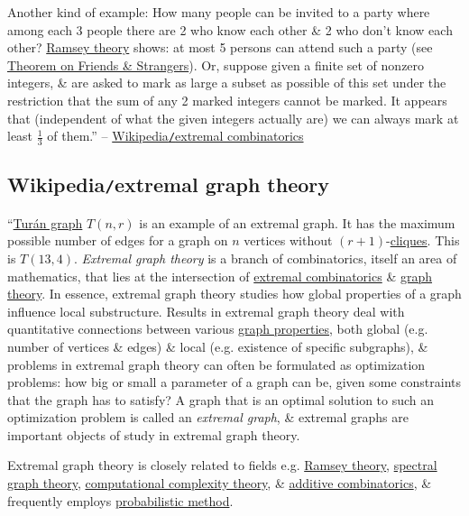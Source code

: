 \documentclass{article}
\begin{document}
Another kind of example: How many people can be invited to a party where among each 3 people there are 2 who know each other \& 2 who don't know each other? \href{https://en.wikipedia.org/wiki/Ramsey_theory}{Ramsey theory} shows: at most 5 persons can attend such a party (see \href{https://en.wikipedia.org/wiki/Theorem_on_Friends_and_Strangers}{Theorem on Friends \& Strangers}). Or, suppose given a finite set of nonzero integers, \& are asked to mark as large a subset as possible of this set under the restriction that the sum of any 2 marked integers cannot be marked. It appears that (independent of what the given integers actually are) we can always mark at least $\frac{1}{3}$ of them.'' -- \href{https://en.wikipedia.org/wiki/Extremal_combinatorics}{Wikipedia{\tt/}extremal combinatorics}


\subsection{Wikipedia{\tt/}extremal graph theory}
``{\sf\href{https://en.wikipedia.org/wiki/Tur%C3%A1n_graph}{Tur\'an graph} $T(n,r)$ is an example of an extremal graph. It has the maximum possible number of edges for a graph on $n$ vertices without $(r + 1)$-\href{https://en.wikipedia.org/wiki/Clique_(graph_theory)}{cliques}. This is $T(13,4)$.} {\it Extremal graph theory} is a branch of combinatorics, itself an area of mathematics, that lies at the intersection of \href{https://en.wikipedia.org/wiki/Extremal_combinatorics}{extremal combinatorics} \& \href{https://en.wikipedia.org/wiki/Graph_theory}{graph theory}. In essence, extremal graph theory studies how global properties of a graph influence local substructure. Results in extremal graph theory deal with quantitative connections between various \href{https://en.wikipedia.org/wiki/Graph_property}{graph properties}, both global (e.g. number of vertices \& edges) \& local (e.g. existence of specific subgraphs), \& problems in extremal graph theory can often be formulated as optimization problems: how big or small a parameter of a graph can be, given some constraints that the graph has to satisfy? A graph that is an optimal solution to such an optimization problem is called an {\it extremal graph}, \& extremal graphs are important objects of study in extremal graph theory.

Extremal graph theory is closely related to fields e.g. \href{https://en.wikipedia.org/wiki/Ramsey_theory}{Ramsey theory}, \href{https://en.wikipedia.org/wiki/Spectral_graph_theory}{spectral graph theory}, \href{https://en.wikipedia.org/wiki/Computational_complexity_theory}{computational complexity theory}, \& \href{https://en.wikipedia.org/wiki/Additive_combinatorics}{additive combinatorics}, \& frequently employs \href{https://en.wikipedia.org/wiki/Probabilistic_method}{probabilistic method}.
\end{document}
